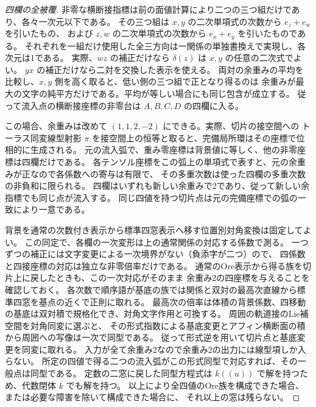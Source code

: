 \begin{proof}[四欄の全被覆]
非零な横断接指標は前の面値計算により二つの三つ組だけであり、各々一次元以下である。
その三つ組は $x,y$ の二次単項式の次数から $e_z+e_w$ を引いたもの、
および $z,w$ の二次単項式の次数から $e_x+e_y$ を引いたものである。
それぞれを一組だけ使用した全三方向は一関係の単独書換えで実現し、各次元は1である。
実際、$wz$ の補正だけなら $\delta(z)$ は $x,y$ の任意の二次式でよい。
$yx$ の補正だけなら二対を交換した表示を使える。
両対の余重みの平均を比較し、$x,y$ 側を高く取ると、低い側の三つ組で正となり得るのは
余重みが最大の文字の純平方だけである。平均が等しい場合にも同じ包含が成立する。
従って流入点の横断接座標の非零台は $A,B,C,D$ の四欄に入る。

この場合、余重みは改めて $(1,1,2,-2)$ にできる。実際、切片の接空間への
トーラス同変線型射影 $\pi$ を接空間上の恒等と取ると、完備局所環はその座標で位相的に生成される。
元の流入弧で、重み零座標は背景値に等しく、他の非零座標は四欄だけである。
各テンソル座標をこの弧上の単項式で表すと、元の余重みが正なので各係数への寄与は有限で、
その多重次数は使った四欄の多重次数の非負和に限られる。
四欄はいずれも新しい余重みで2であり、従って新しい余指標でも同じ点が流入する。
同じ四値を持つ切片点は元の完備座標での弧の一致により一意である。

背景を通常の次数付き表示から標準四窓表示へ移す位置別対角変換は固定してよい。
この同定で、各欄の一次変形は上の通常関係の対応する係数で測る。
一つずつの補正には文字変更による一次境界がない（負添字が二つ）ので、
四係数と四接座標の対応は独立な非零倍率だけである。
通常のOre表示から得る族を切片上に戻したときも、この一次対応がそのまま
余重み2の四座標を与えることを確認しておく。
各次数で順序語が基底の族では関係と双対の最高次直線から標準四窓を基点の近くで正則に取れる。
最高次の倍率は体積の背景係数、四移動の基底は双対積で規格化でき、対角文字作用と可換する。
周囲の軌道接のLie補空間を対角同変に選ぶと、
その形式指数による基底変更とアフィン横断面の積から周囲への写像は一次で同型である。
従って形式逆を用いて切片点と基底変更を同変に取れる。
入力が全て余重み2なので余重み2の出力には線型項しか入らない。
所定の四値で得る二つの流入弧がこの形式同型で対応すれば、その一般点は同型である。
定数の二窓に戻した同型方程式は $k((u))$ で解を持つため、代数閉体 $k$ でも解を持つ。
以上により全四値のOre族を構成できた場合、または必要な障害を除いて構成できた場合に、
それ以上の窓は残らない。
\end{proof}

